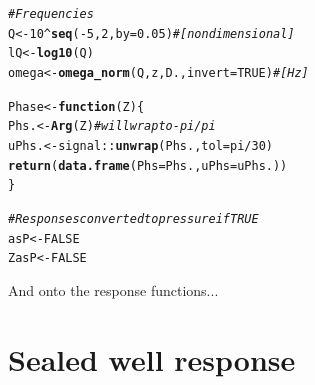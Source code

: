 \documentclass[12pt]{article}\usepackage[]{graphicx}\usepackage[]{color}
\makeatletter
\newcommand{\hlnum}[1]{\textcolor[rgb]{0.686,0.059,0.569}{#1}}%
\newcommand{\hlcom}[1]{\textcolor[rgb]{0.678,0.584,0.686}{\textit{#1}}}%
\newcommand{\hlopt}[1]{\textcolor[rgb]{0,0,0}{#1}}%
\newcommand{\hlstd}[1]{\textcolor[rgb]{0.345,0.345,0.345}{#1}}%
\newcommand{\hlkwa}[1]{\textcolor[rgb]{0.161,0.373,0.58}{\textbf{#1}}}%
\newcommand{\hlkwb}[1]{\textcolor[rgb]{0.69,0.353,0.396}{#1}}%
\newcommand{\hlkwc}[1]{\textcolor[rgb]{0.333,0.667,0.333}{#1}}%
\newcommand{\hlkwd}[1]{\textcolor[rgb]{0.737,0.353,0.396}{\textbf{#1}}}%
\newenvironment{kframe}{%
 \def\at@end@of@kframe{}%
 \ifinner\ifhmode%
  \def\at@end@of@kframe{\end{minipage}}%
  \begin{minipage}{\columnwidth}%
 \fi\fi%
 \def\FrameCommand##1{\hskip\@totalleftmargin \hskip-\fboxsep
 \colorbox{shadecolor}{##1}\hskip-\fboxsep
     \hskip-\linewidth \hskip-\@totalleftmargin \hskip\columnwidth}%
 \MakeFramed {\advance\hsize-\width
   \@totalleftmargin\z@ \linewidth\hsize
   \@setminipage}}%
 {\par\unskip\endMakeFramed%
 \at@end@of@kframe}
\newenvironment{knitrout}{}{} %
\makeatother
\begin{document}
\begin{knitrout}\small
{}\color{fgcolor}\begin{kframe}
\begin{alltt}
\hlcom{# Frequencies}
\hlstd{Q} \hlkwb{<-} \hlnum{10}\hlopt{^}\hlkwd{seq}\hlstd{(}\hlopt{-}\hlnum{5}\hlstd{,} \hlnum{2}\hlstd{,} \hlkwc{by} \hlstd{=} \hlnum{0.05}\hlstd{)}  \hlcom{# [nondimensional]}
\hlstd{lQ} \hlkwb{<-} \hlkwd{log10}\hlstd{(Q)}
\hlstd{omega} \hlkwb{<-} \hlkwd{omega_norm}\hlstd{(Q, z, D.,} \hlkwc{invert} \hlstd{=} \hlnum{TRUE}\hlstd{)}  \hlcom{# [Hz]}

\hlstd{Phase} \hlkwb{<-} \hlkwa{function}\hlstd{(}\hlkwc{Z}\hlstd{) \{}
    \hlstd{Phs.} \hlkwb{<-} \hlkwd{Arg}\hlstd{(Z)}  \hlcom{# will wrap to -pi/pi}
    \hlstd{uPhs.} \hlkwb{<-} \hlstd{signal}\hlopt{::}\hlkwd{unwrap}\hlstd{(Phs.,} \hlkwc{tol} \hlstd{= pi}\hlopt{/}\hlnum{30}\hlstd{)}
    \hlkwd{return}\hlstd{(}\hlkwd{data.frame}\hlstd{(}\hlkwc{Phs} \hlstd{= Phs.,} \hlkwc{uPhs} \hlstd{= uPhs.))}
\hlstd{\}}

\hlcom{# Responses converted to pressure if TRUE}
\hlstd{asP} \hlkwb{<-} \hlnum{FALSE}
\hlstd{ZasP} \hlkwb{<-} \hlnum{FALSE}
\end{alltt}
\end{kframe}
\end{knitrout}

And onto the response functions...

\clearpage
\section{Sealed well response}
\end{document}
